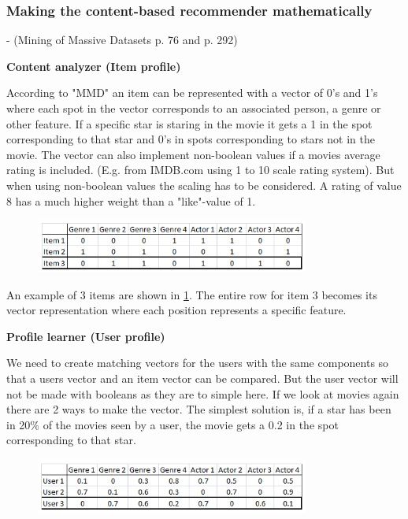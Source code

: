 \subsubsection{Making the content-based recommender mathematically}
- (Mining of Massive Datasets p. 76 and p. 292)

\textbf{Content analyzer (Item profile)}

According to "MMD" an item can be represented with a vector of 0's and 1's where each spot in the vector corresponds to an associated person, a genre or other feature. If a specific star is staring in the movie it gets a 1 in the spot corresponding to that star and 0's in spots corresponding to stars not in the movie. The vector can also implement non-boolean values if a movies average rating is included. (E.g. from IMDB.com using 1 to 10 scale rating system). But when using non-boolean values the scaling has to be considered. A rating of value 8 has a much higher weight than a "like"-value of 1.

\begin{figure}[H]
\centering
\includegraphics[width=0.8\textwidth]{Images/Vector representation items.png}
\caption{}
\label{VrepItem}
\end{figure}

An example of 3 items are shown in \ref{VrepItem}. The entire row for item 3 becomes its vector representation where each position represents a specific feature.  
 
\textbf{Profile learner (User profile)}

We need to create matching vectors for the users with the same components so that a users vector and an item vector can be compared. But the user vector will not be made with booleans as they are to simple here. If we look at movies again there are 2 ways to make the vector. The simplest solution is, if a star has been in 20\% of the movies seen by a user, the movie gets a 0.2 in the spot corresponding to that star.

\begin{figure}[H]
\centering
\includegraphics[width=0.8\textwidth]{Images/Vector representation Users.png}
\caption{}
\label{VrepUser}
\end{figure}

